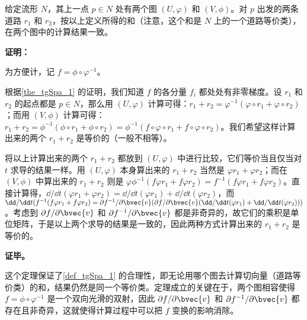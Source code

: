 \begin{theorem}{}
给定流形 $N$，其上一点 $p\in N$ 处有两个图 $(U, \varphi)$ 和 $(V, \phi)$。对 $p$ 出发的两条道路 $r_1$ 和 $r_2$，按以上定义所得的和（注意，这个和是 $N$ 上的一个道路等价类），在两个图中的计算结果一致。
\end{theorem}

\textbf{证明：}

为方便计，记 $f=\phi\circ\varphi^{-1}$。

根据\autoref{the_tgSpa_1} 的证明，我们知道 $f$ 的各分量 $f_i$ 都处处有非零梯度。设 $r_1$ 和 $r_2$ 的起点都是 $p\in N$，那么用 $(U, \varphi)$ 计算可得：$r_1+r_2=\varphi^{-1}(\varphi\circ r_1+\varphi\circ r_2)$；而用 $(V, \phi)$ 计算可得：$r_1+r_2=\phi^{-1}(\phi\circ r_1+\phi\circ r_2)=\phi^{-1}(f\circ\varphi\circ r_1+f\circ\varphi\circ r_2)$。我们希望这样计算出来的两个 $r_1+r_2$ 是等价的（一般不相等）。

将以上计算出来的两个 $r_1+r_2$ 都放到 $(U, \varphi)$ 中进行比较，它们等价当且仅当对 $t$ 求导的结果一样。用 $(U, \varphi)$ 本身算出来的 $r_1+r_2$ 当然是 $\varphi r_1+\varphi r_2$；而在 $(V, \phi)$ 中算出来的 $r_1+r_2$ 则是 $\varphi\phi^{-1}(f\varphi r_1+f\varphi r_2)=f^{-1}(f\varphi r_1+f\varphi r_2)$。直接计算得，$\dd/\dd t(\varphi r_1+\varphi r_2)=\dd/\dd t(\varphi r_1)+\dd/\dd t(\varphi r_2)$，而 $\dd/\dd t(f^{-1}(f\varphi r_1+f\varphi r_2)=\partial f^{-1}/\partial\bvec{v}(\partial f/\partial\bvec{v}(\dd/\dd t(\varphi r_1)+\dd/\dd t(\varphi r_2)))$。考虑到 $\partial f/\partial\bvec{v}$ 和 $\partial f^{-1}/\partial\bvec{v}$ 都是非奇异的，故它们的乘积是单位矩阵，于是以上两个求导的结果是一致的，因此两种方式计算出来的 $r_1+r_2$ 是等价的。

\textbf{证毕。}

这个定理保证了\autoref{def_tgSpa_1} 的合理性，即无论用哪个图去计算切向量（道路等价类）的和，结果仍然是同一个等价类。定理成立的关键在于，两个图相容使得 $f=\phi\circ\varphi^{-1}$ 是一个双向光滑的双射，因此 $\partial f/\partial\bvec{v}$ 和 $\partial f^{-1}/\partial\bvec{v}$ 都存在且非奇异，这就使得计算过程中可以把 $f$ 变换的影响消除。





